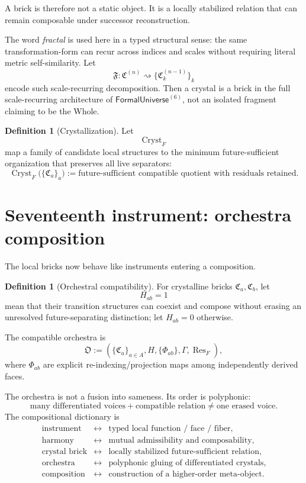 \documentclass[10pt]{article}
\theoremstyle{pe}
\theoremstyle{definition}
\newtheorem{definition}[theorem]{Definition}
\newcommand{\Res}{\operatorname{Res}}
\newcommand{\FormalUniverse}{\mathsf{FormalUniverse}}
\begin{document}
A brick is therefore not a static object.  It is a locally stabilized relation that can remain composable under successor reconstruction.

The word \emph{fractal} is used here in a typed structural sense: the same transformation-form can recur across indices and scales without requiring literal metric self-similarity.  Let
\[
  \mathfrak F:
  \mathfrak C^{(n)}
  \rightsquigarrow
  \{\mathfrak C_k^{(n-1)}\}_k
\]
encode such scale-recurring decomposition.  Then a crystal is a brick in the full scale-recurring architecture of \(\FormalUniverse^{(6)}\), not an isolated fragment claiming to be the Whole.

\begin{definition}[Crystallization]
Let
\[
  \operatorname{Cryst}_{F}
\]
map a family of candidate local structures to the minimum future-sufficient organization that preserves all live separators:
\begin{equation}\label{eq:crystallize}
  \operatorname{Cryst}_{F}
  \bigl(\{\mathfrak C_a\}_a\bigr)
  :=
  \text{future-sufficient compatible quotient with residuals retained}.
\end{equation}
\end{definition}

\section{Seventeenth instrument: orchestra composition}

The local bricks now behave like instruments entering a composition.

\begin{definition}[Orchestral compatibility]
For crystalline bricks \(\mathfrak C_a,\mathfrak C_b\), let
\[
  H_{ab}=1
\]
mean that their transition structures can coexist and compose without erasing an unresolved future-separating distinction; let \(H_{ab}=0\) otherwise.
\end{definition}

The compatible orchestra is
\[
  \mathfrak O
  :=
  \left(
    \{\mathfrak C_a\}_{a\in A},
    H,
    \{\Phi_{ab}\},
    \Gamma,
    \Res_F
  \right),
\]
where \(\Phi_{ab}\) are explicit re-indexing/projection maps among independently derived faces.

The orchestra is not a fusion into sameness.  Its order is polyphonic:
\[
  \boxed{
  \text{many differentiated voices}
  +
  \text{compatible relation}
  \neq
  \text{one erased voice}.
  }
\]
The compositional dictionary is
\[
  \boxed{
  \begin{array}{rcl}
  \text{instrument} &\leftrightarrow& \text{typed local function / face / fiber},\\
  \text{harmony} &\leftrightarrow& \text{mutual admissibility and composability},\\
  \text{crystal brick} &\leftrightarrow& \text{locally stabilized future-sufficient relation},\\
  \text{orchestra} &\leftrightarrow& \text{polyphonic gluing of differentiated crystals},\\
  \text{composition} &\leftrightarrow& \text{construction of a higher-order meta-object}.
  \end{array}
  }
\]
\end{document}
